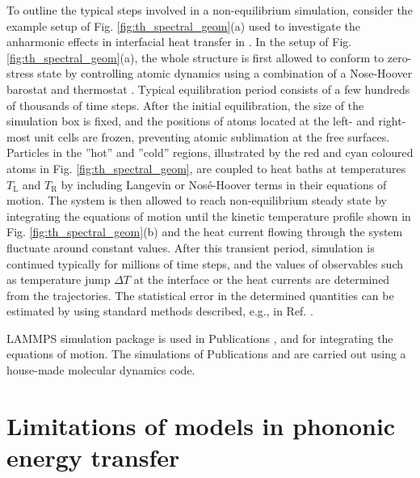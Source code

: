 To outline the typical steps involved in a non-equilibrium simulation, consider the example setup of Fig. \ref{fig:th_spectral_geom}(a) used to investigate the anharmonic effects in interfacial heat transfer in . In the setup of Fig. \ref{fig:th_spectral_geom}(a), the whole structure is first allowed to conform to zero-stress state by controlling atomic dynamics using a combination of a Nose-Hoover barostat and thermostat \cite{allentildesley}. Typical equilibration period consists of a few hundreds of thousands of time steps. After the initial equilibration, the size of the simulation box is fixed, and the positions of atoms located at the left- and right-most unit cells are frozen, preventing atomic sublimation at the free surfaces. Particles in the ''hot'' and ''cold'' regions, illustrated by the red and cyan coloured atoms in Fig. \ref{fig:th_spectral_geom}, are coupled to heat baths at temperatures $T_{\textrm{L}}$ and $T_{\textrm{R}}$ by including Langevin or Nos\'e-Hoover terms in their equations of motion. The system is then allowed to reach non-equilibrium steady state by integrating the equations of motion until the kinetic temperature profile shown in Fig. \ref{fig:th_spectral_geom}(b) and the heat current flowing through the system fluctuate around constant values. After this transient period, simulation is continued typically for millions of time steps, and the values of observables such as temperature jump $\Delta T$ at the interface or the heat currents are determined from the trajectories. The statistical error in the determined quantities can be estimated by using standard methods described, e.g., in Ref. \cite{allentildesley}.

LAMMPS simulation package \cite{plimpton95,lammps_website} is used in Publications ,  and  for integrating the equations of motion. The simulations of Publications  and  are carried out using a house-made molecular dynamics code. 

\section{Limitations of models in phononic energy transfer}





